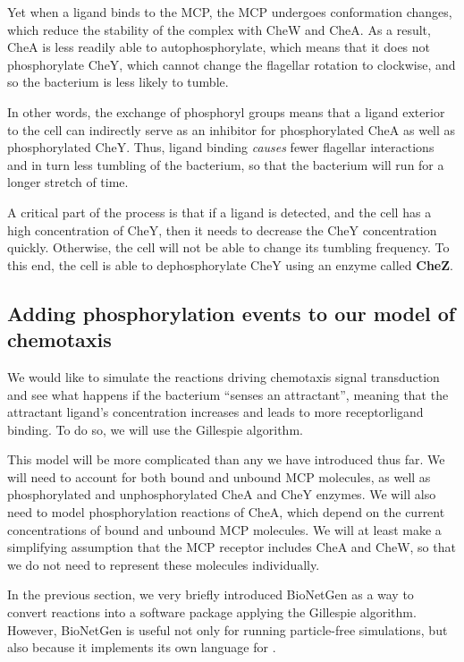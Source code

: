Yet when a ligand binds to the MCP, the MCP undergoes conformation changes, which reduce the stability of the complex with CheW and CheA. As a result, CheA is less readily able to autophosphorylate, which means that it does not phosphorylate CheY, which cannot change the flagellar rotation to clockwise, and so the bacterium is less likely to tumble.

In other words, the exchange of phosphoryl groups means that a ligand exterior to the cell can indirectly serve as an inhibitor for phosphorylated CheA as well as phosphorylated CheY. Thus, ligand binding \textit{causes} fewer flagellar interactions and in turn less tumbling of the bacterium, so that the bacterium will run for a longer stretch of time.

A critical part of the process is that if a ligand is detected, and the cell has a high concentration of CheY, then it needs to decrease the CheY concentration quickly. Otherwise, the cell will not be able to change its tumbling frequency. To this end, the cell is able to dephosphorylate CheY using an enzyme called \textbf{CheZ}.


\FloatBarrier
{}
\subsection{Adding phosphorylation events to our model of chemotaxis}


We would like to simulate the reactions driving chemotaxis signal transduction and see what happens if the bacterium ``senses an attractant'', meaning that the attractant ligand's concentration increases and leads to more receptor\-ligand binding. To do so, we will use the Gillespie algorithm.

This model will be more complicated than any we have introduced thus far. We will need to account for both bound and unbound MCP molecules, as well as phosphorylated and unphosphorylated CheA and CheY enzymes. We will also need to model phosphorylation reactions of CheA, which depend on the current concentrations of bound and unbound MCP molecules. We will at least make a simplifying assumption that the MCP receptor includes CheA and CheW, so that we do not need to represent these molecules individually.

In the previous section, we very briefly introduced BioNetGen as a way to convert reactions into a software package applying the Gillespie algorithm. However, BioNetGen is useful not only for running particle-free simulations, but also because it implements its own language for .

